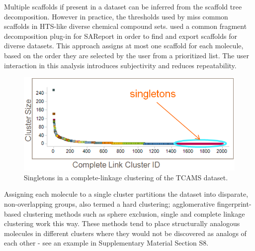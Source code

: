 \documentclass[journal=jacsat,biochem,manuscript=article]{achemso}
\begin{document}

Multiple scaffolds if present in a dataset can be inferred from the
scaffold tree decomposition\cite{ClarkLabute2008SAReport}. However in
practice, the thresholds used by \citet{ClarkLabute2008SAReport}
miss common scaffolds in HTS-like diverse chemical compound
sets. \citet{Bandyopadhyay2012ACS} used a common fragment
decomposition plug-in for SAReport in order to find and export
scaffolds for diverse datasets.  This approach assigns at most one scaffold for
each molecule, based on the order they are selected by the user from a
prioritized list.  The user interaction in this analysis introduces subjectivity and
reduces repeatability.

\begin{figure}
\includegraphics[width=5.5in]{fig/singletons.png}
\caption{Singletons in a complete-linkage clustering of the TCAMS dataset.}
\label{fig:platypus}
\end{figure}

Assigning each molecule to a single cluster partitions the dataset into
disparate, non-overlapping groups, also termed a hard clustering;
agglomerative fingerprint-based clustering methods such as sphere exclusion, single and complete linkage clustering\cite{Downs2003} work this way. These methods tend to place structurally analogous molecules in different clusters where they would not be discovered as analogs of each other - see an example in Supplementary Material Section S8. 
\end{document}
